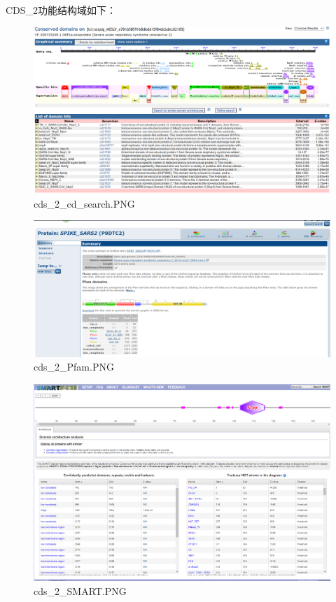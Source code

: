 \documentclass[supercite]{HustGraduPaper}
\begin{document}
	\paragraph{}\label{subpara:subpara}CDS\_2功能结构域如下：
	\begin{figure}[H]
		\centering
		\includegraphics[width=1\textwidth]{./material/practice2/cds_2/cd_search.png}
		\caption{cds\_2\_cd\_search.PNG}
	\end{figure}
	\begin{figure}[H]
		\centering
		\includegraphics[width=1\textwidth]{./material/practice2/cds_2/Pfam.png}
		\caption{cds\_2\_Pfam.PNG}
	\end{figure}
	\begin{figure}[H]
		\centering
		\includegraphics[width=1\textwidth]{./material/practice2/cds_2/SMART.png}
		\caption{cds\_2\_SMART.PNG}
	\end{figure}
\end{document}
